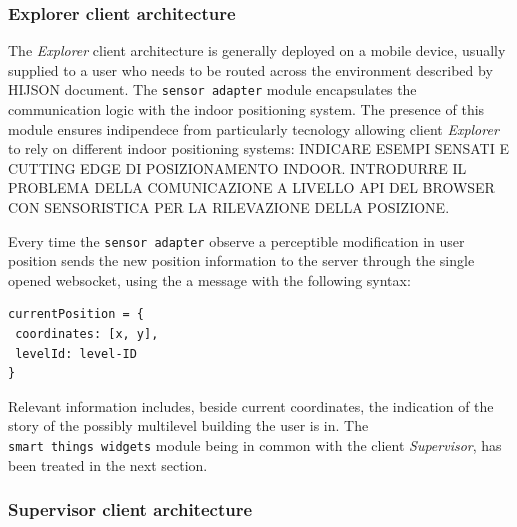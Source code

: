 \documentclass{sig-alternate}
\begin{document}
\subsubsection{Explorer client architecture}\label{explorer-client-architecture}

The \emph{Explorer} client architecture is generally deployed on a
mobile device, usually supplied to a user who needs to be routed across
the environment described by HIJSON document. The
\texttt{sensor\ adapter} module encapsulates the communication logic
with the indoor positioning system. The presence of this module ensures
indipendece from particularly tecnology allowing client \emph{Explorer}
to rely on different indoor positioning systems: INDICARE ESEMPI SENSATI
E CUTTING EDGE DI POSIZIONAMENTO INDOOR. INTRODURRE IL PROBLEMA DELLA
COMUNICAZIONE A LIVELLO API DEL BROWSER CON SENSORISTICA PER LA
RILEVAZIONE DELLA POSIZIONE.

Every time the \texttt{sensor\ adapter} observe a perceptible
modification in user position sends the new position information to the
server through the single opened websocket, using the a message with the
following syntax:

\begin{verbatim}
currentPosition = {
 coordinates: [x, y],
 levelId: level-ID 
}
\end{verbatim}

Relevant information includes, beside current coordinates, the
indication of the story of the possibly multilevel building the user is
in. The \texttt{smart\ things\ widgets} module being in common with the
client \emph{Supervisor}, has been treated in the next section.

\subsubsection{Supervisor client architecture}\label{supervisor-client-architecture}
\end{document}
